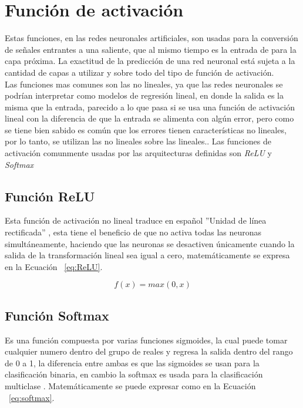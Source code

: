 \section{Función de activación}

Estas funciones, en las redes neuronales artificiales, son usadas para la conversión de señales entrantes a una saliente, que al mismo tiempo es la entrada de para la capa próxima. La exactitud de la predicción de una red neuronal está sujeta a la cantidad de capas a utilizar y sobre todo del tipo de función de activación.\\

Las funciones mas comunes son las no lineales, ya que las redes neuronales se podrían interpretar como modelos de regresión lineal, en donde la salida es la misma que la entrada, parecido a lo que pasa si se usa una función de activación lineal con la diferencia de que la entrada se alimenta con algún error, pero como se tiene bien sabido es común que los errores tienen características   no lineales, por lo tanto, se utilizan las no lineales sobre las lineales.\cite{sharma2017activation}. Las funciones de activación comunmente usadas por las arquitecturas definidas son \textit{ReLU} y \textit	{Softmax}	


\subsection{Función ReLU}

Esta función de activación no lineal traduce en español ”Unidad de línea rectificada” , esta tiene el beneficio de que no activa todas las neuronas simultáneamente, haciendo que las neuronas se desactiven únicamente cuando la salida de la transformación lineal sea igual a cero\cite{sharma2017activation}, matemáticamente se expresa en la Ecuación ~\ref{eq:ReLU}.

\begin{equation}
	\label{eq:ReLU}
	f(x)=max(0,x)
\end{equation}

\subsection{Función Softmax}

Es una función compuesta por varias funciones sigmoides, la cual puede tomar cualquier numero dentro del grupo de reales y regresa la salida dentro del rango de 0 a 1, la diferencia entre ambas es que las sigmoides se usan para la clasificación binaria, en cambio la softmax es usada para la clasificación multiclase \cite{sharma2017activation}. Matemáticamente se puede expresar como en la Ecuación  ~\ref{eq:softmax}.

